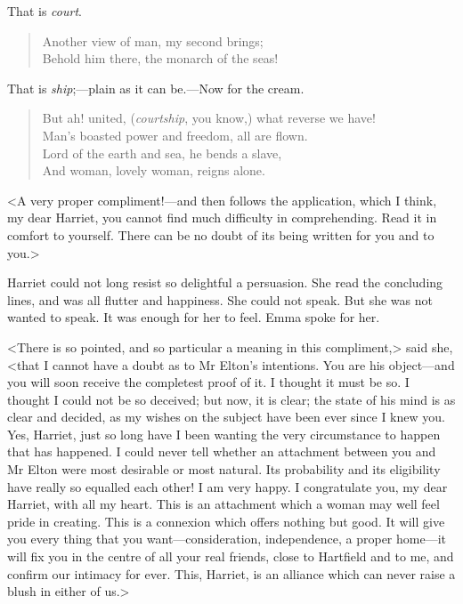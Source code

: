 That is \textit{court}.

\begin{verse}
\begin{altverse}
Another view of man, my second brings;\\
    Behold him there, the monarch of the seas!
	\end{altverse}
\end{verse}

That is \textit{ship};—plain as it can be.—Now for the cream.

\begin{verse}
\begin{altverse}
But ah! united, (\textit{courtship}, you know,) what reverse we have!\\
    Man's boasted power and freedom, all are flown.\\
Lord of the earth and sea, he bends a slave,\\
    And woman, lovely woman, reigns alone.\\
	
	\end{altverse}
\end{verse}

<A very proper compliment!—and then follows the application, which I think, my dear Harriet, you cannot find much difficulty in comprehending. Read it in comfort to yourself. There can be no doubt of its being written for you and to you.>

Harriet could not long resist so delightful a persuasion. She read the concluding lines, and was all flutter and happiness. She could not speak. But she was not wanted to speak. It was enough for her to feel. Emma spoke for her.

<There is so pointed, and so particular a meaning in this compliment,> said she, <that I cannot have a doubt as to Mr Elton's intentions. You are his object—and you will soon receive the completest proof of it. I thought it must be so. I thought I could not be so deceived; but now, it is clear; the state of his mind is as clear and decided, as my wishes on the subject have been ever since I knew you. Yes, Harriet, just so long have I been wanting the very circumstance to happen that has happened. I could never tell whether an attachment between you and Mr Elton were most desirable or most natural. Its probability and its eligibility have really so equalled each other! I am very happy. I congratulate you, my dear Harriet, with all my heart. This is an attachment which a woman may well feel pride in creating. This is a connexion which offers nothing but good. It will give you every thing that you want—consideration, independence, a proper home—it will fix you in the centre of all your real friends, close to Hartfield and to me, and confirm our intimacy for ever. This, Harriet, is an alliance which can never raise a blush in either of us.>

